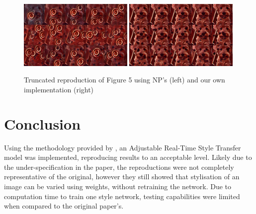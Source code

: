 \documentclass{article} %
\begin{document}
\begin{figure}[h!]
    \centering
    \includegraphics[width=0.49\textwidth, scale=0.1]{fig5git.png}
    \includegraphics[width=0.49\textwidth, scale=0.1]{fig5own.png}
    \vspace{-3mm}
    \caption{Truncated reproduction of Figure 5 using NP's (left) and our own implementation (right)}
    \label{fig5git}
\end{figure}

\section{Conclusion}
Using the methodology provided by \cite{babaeizadeh2018adjustable}, an Adjustable Real-Time Style Transfer model was implemented, reproducing results to an acceptable level. Likely due to the under-specification in the paper, the reproductions were not completely representative of the original, however they still showed that stylisation of an image can be varied using weights, without retraining the network. Due to computation time to train one style network, testing capabilities were limited when compared to the original paper's.



\end{document}
